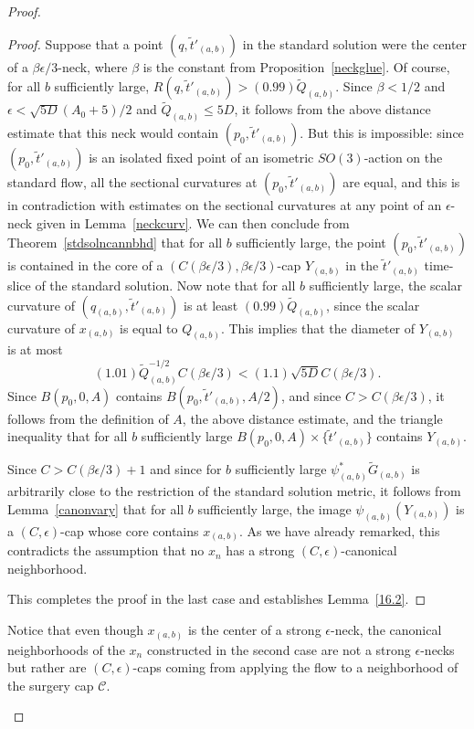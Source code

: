 \begin{proof}
\begin{proof}
Suppose that a point $(q,\tilde t'_{(a,b)})$ in the standard solution were the center of a
$\beta\epsilon/3$-neck, where $\beta$ is the constant from Proposition~\ref{neckglue}.
 Of course, for all $b$ sufficiently large, $R(q,\tilde
t'_{(a,b)})>(0.99)\tilde Q_{(a,b)}$. Since $\beta<1/2$ and
$\epsilon<\sqrt{5D}(A_0+5)/2$ and $\tilde Q_{(a,b)}\le 5D$, it follows from the
above distance estimate that this neck would contain $(p_0,\tilde t'_{(a,b)})$.
But this is impossible: since $(p_0,\tilde t'_{(a,b)})$ is an isolated fixed
point of an isometric $SO(3)$-action on the standard flow, all the sectional
curvatures at $(p_0,\tilde t'_{(a,b)})$ are equal, and this is in contradiction
with estimates on the sectional curvatures at any point of an $\epsilon$-neck
given in Lemma~\ref{neckcurv}. We can then conclude from Theorem~\ref{stdsolncannbhd}
that for all $b$ sufficiently large, the point $(p_0,\tilde t'_{(a,b)})$ is
contained in the core of a $(C(\beta\epsilon/3),\beta\epsilon/3)$-cap
$Y_{(a,b)}$ in the $\tilde t'_{(a,b)}$ time-slice of the standard solution.
Now note that for
all $b$ sufficiently large, the scalar curvature of $(q_{(a,b)},\tilde
t'_{(a,b)})$ is at least $(0.99)\tilde Q_{(a,b)}$, since the scalar curvature of $x_{(a,b)}$
is equal to $Q_{(a,b)}$. This implies that the
diameter of $Y_{(a,b)}$ is at most
$$(1.01)\tilde Q^{-1/2}_{(a,b)}C(\beta\epsilon/3)<(1.1)\sqrt{5D}C(\beta\epsilon/3).$$
Since $B(p_0,0,A)$ contains $B(p_0,\tilde t'_{(a,b)},A/2)$, and since
$C>C(\beta\epsilon/3)$, it follows from the definition of $A$, the above
distance estimate, and the triangle inequality that for all $b$ sufficiently
large $B(p_0,0,A)\times\{\tilde t'_{(a,b)}\}$ contains $Y_{(a,b)}$.




 Since $C>
C(\beta\epsilon/3)+1$ and since for $b$ sufficiently large
$\psi_{(a,b)}^*\widetilde G_{(a,b)}$ is arbitrarily close to the
restriction of the standard solution metric, it follows from
Lemma~\ref{canonvary} that for all $b$ sufficiently large, the image $\psi_{(a,b)}(Y_{(a,b)})$
 is a $(C,\epsilon)$-cap whose core contains $x_{(a,b)}$.
As we have already remarked, this contradicts the assumption that no $x_n$
has a strong $(C,\epsilon)$-canonical neighborhood.

 This completes the proof in the last case and establishes
Lemma~\ref{16.2}.
\end{proof}






\begin{remark}
\label{rem:limit-canonical-neighborhood-is-cap}
Notice that even though $x_{(a,b)}$ is the center of a strong
$\epsilon$-neck, the canonical neighborhoods of the $x_n$ constructed
in the second case are not a strong $\epsilon$-necks but rather are
$(C,\epsilon)$-caps coming from applying the flow to a
neighborhood of the surgery cap ${\mathcal C}$.
\end{remark}


\end{proof}
